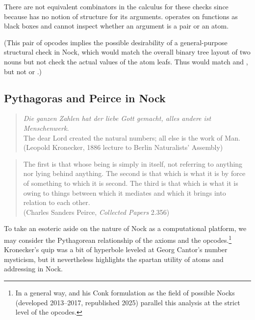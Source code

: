 There are not equivalent combinators in the  calculus for these checks since because  has no notion of structure for its arguments.   operates on functions as black boxes and cannot inspect whether an argument is a pair or an atom.

(This pair of opcodes implies the possible desirability of a general-purpose structural check in Nock, which would match the overall binary tree layout of two nouns but not check the actual values of the atom leafs.  Thus \textct{[0 1 2]} would match \textct{[0 1 2]} and \textct{[0 1 3]}, but not \textct{[[0 1] 2 3]} or \textct{[0 1]}.)


\subsection{Pythagoras and Peirce in Nock}

\begin{quote}
  \emph{Die ganzen Zahlen hat der liebe Gott gemacht, alles andere ist Menschenwerk.} \\
  The dear Lord created the natural numbers; all else is the work of Man. \\
  (Leopold Kronecker, 1886 lecture to Berlin Naturalists' Assembly)
\end{quote}

\begin{quote}
  The first is that whose being is simply in itself, not referring to anything nor lying behind anything. The second is that which is what it is by force of something to which it is second. The third is that which is what it is owing to things between which it mediates and which it brings into relation to each other. \\
  (Charles Sanders Peirce, \emph{Collected Papers} 2.356)
\end{quote}

To take an esoteric aside on the nature of Nock as a computational platform, we may consider the Pythagorean relationship of the axioms and the opcodes.\footnote{In a general way,  and his Conk formulation as the field of possible Nocks (developed 2013--2017, republished 2025) parallel this analysis at the strict level of the opcodes.}  Kronecker's quip was a bit of hyperbole leveled at Georg Cantor's number mysticism, but it nevertheless highlights the spartan utility of atoms and addressing in Nock.

